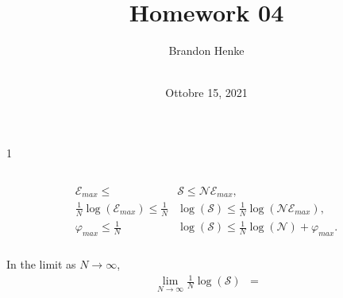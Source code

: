 \documentclass[a4paper,12pt,twoside]{article}
\title{Homework 04}
\author{
	Brandon Henke\\
	\course\\
	\professor
}
\date{Ottobre 15, 2021}
\newcommand{\mcols}{0}
\begin{document}

\maketitle
\if\mcols1
\begin{multicols*}{2}
\fi

\setcounter{section}{4}
\subsection{}%
\subsubsection{}
\begin{align}
	\mathcal{E}_{max} \leq &\mathcal{S} \leq \mathcal{N} \mathcal{E}_{max},\\
	\frac{1}{N}\log(\mathcal{E}_{max}) \leq \frac{1}{N}&\log(\mathcal{S}) \leq \frac{1}{N}\log(\mathcal{N} \mathcal{E}_{max}),\\
	\varphi_{max} \leq \frac{1}{N}&\log(\mathcal{S}) \leq \frac{1}{N}\log(\mathcal{N}) + \varphi_{max}.
\end{align}
\subsubsection{}
In the limit as $N\rightarrow\infty$,
\begin{align}
	\lim_{N\rightarrow\infty} \frac{1}{N}\log(\mathcal{S}) &=
\end{align}
\subsection{}%
\subsection{}%
\subsubsection{}
\subsubsection{}
\subsubsection{}
\subsection{}%

\end{multicols*}
\end{document}
